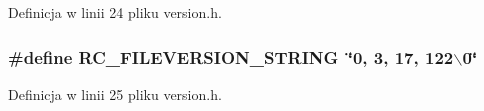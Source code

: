 Definicja w linii 24 pliku version.h.\hypertarget{a00010_4763e81d3c29ec0fab79225d3ec3f1a2}{
\subsubsection[{RC\_\-FILEVERSION\_\-STRING}]{\setlength{\rightskip}{0pt plus 5cm}\#define RC\_\-FILEVERSION\_\-STRING~\char`\"{}0, 3, 17, 122$\backslash$0\char`\"{}}}
\label{a00010_4763e81d3c29ec0fab79225d3ec3f1a2}




Definicja w linii 25 pliku version.h.